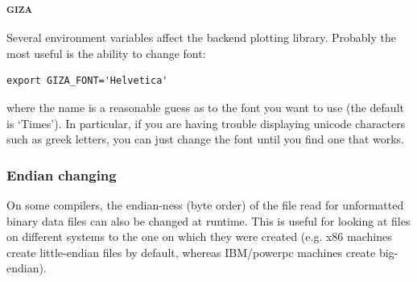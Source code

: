 \documentclass[a4paper,10pt]{article}
\newcommand{\splash}{\textsc{splash }}
\newcommand{\giza}{\textsc{giza }}
\begin{document}
%

\subsubsection{\giza}
Several environment variables affect the backend plotting library. Probably the most useful is the ability to change font:
\begin{verbatim}
export GIZA_FONT='Helvetica'
\end{verbatim}
where the name is a reasonable guess as to the font you want to use (the default is `Times'). In particular, if you are having trouble displaying unicode characters such as greek letters, you can just change the font until you find one that works.

\subsubsection{ Endian changing}
 On some compilers, the endian-ness (byte order) of the file read for unformatted binary data files can also be changed at runtime. This is useful for looking at files on different systems to the one on which they were created (e.g. x86 machines create little-endian files by default, whereas IBM/powerpc machines create big-endian).
\end{document}
